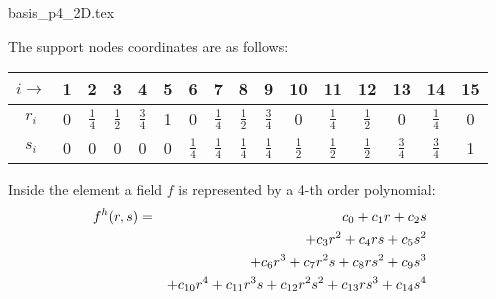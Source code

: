 \begin{flushright} {\tiny {\color{gray} basis\_p4\_2D.tex}} \end{flushright}



The support nodes coordinates are as follows:

\begin{center}
\begin{tabular}{cccccccccccccccc}
\hline
$i\rightarrow$& 1 &2 &3 &4 &5 &6 &7 &8 &9 &10 &11 &12 &13 &14 &15 \\
\hline\hline
$r_i$&0&$\frac14$ & $\frac12$ & $\frac34$ & 1 &0 &$\frac14$&$\frac12$&
$\frac34$&0&$\frac14$&$\frac12$&0&$\frac14$&0    \\
$s_i$&0&0&0&0&0&$\frac14$&$\frac14$&$\frac14$&$\frac14$
&$\frac12$&$\frac12$&$\frac12$
&$\frac34$&$\frac34$&1\\
\hline
\end{tabular}
\end{center}

Inside the element a field $f$ is represented by a 4-th order polynomial:
\begin{eqnarray}
f^h(r,s)
&=&c_0 + c_1 r+c_2 s \nonumber\\
&&+ c_3 r^2 + c_4 rs + c_5 s^2 \nonumber\\
&&+c_6r^3 + c_7 r^2s + c_8 rs^2 + c_9 s^3 \nonumber\\
&&
+ c_{10} r^4 
+ c_{11} r^3s 
+ c_{12} r^2s^2
+ c_{13} rs^3
+c_{14} s^4
\end{eqnarray}

